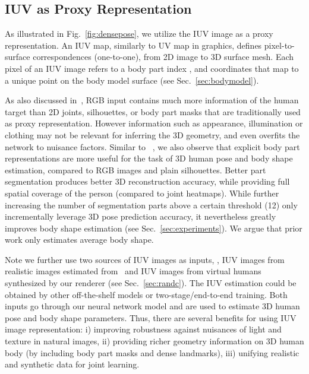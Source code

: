 \documentclass[10pt,twocolumn,letterpaper]{article}
\newcommand{\beforesubsection}{\vspace{0mm}}
\newcommand{\aftersubsection}{\vspace{0mm}}
\begin{document}
\beforesubsection
\subsection{IUV as Proxy Representation} \label{sec:IUVrep}
\aftersubsection

As illustrated in Fig.~\ref{fig:densepose}, we utilize the IUV image as a proxy representation. An IUV map, similarly to UV map in graphics, defines pixel-to-surface correspondences (one-to-one), from 2D image to 3D surface mesh. Each pixel of an IUV image refers to a body part index , and  coordinates that map to a unique point on the body model surface (see Sec.~\ref{sec:bodymodel}).

As also discussed in~\cite{NeuralBodyFit18}, RGB input contains much more information of the human target than 2D joints, silhouettes, or body part masks that are traditionally used as proxy representation. However information such as appearance, illumination or clothing may not be relevant for inferring the 3D geometry, and even overfits the network to nuisance factors. Similar to ~\cite{NeuralBodyFit18}, we also observe that explicit body part representations are more useful for the task of 3D human pose and body shape estimation, compared to RGB images and plain silhouettes. Better part segmentation produces better 3D reconstruction accuracy, while providing full spatial coverage of the person (compared to joint heatmaps).
While further increasing the number of segmentation parts above a certain threshold (12) only incrementally leverage 3D pose prediction accuracy, it nevertheless greatly improves body shape estimation (see Sec.~\ref{sec:experiments}).
We argue that prior work only estimates average body shape.

Note we further use two sources of IUV images as inputs, \ie, IUV images from realistic images estimated from~\cite{DensePose2018} and IUV images from virtual humans synthesized by our renderer (see Sec.~\ref{sec:randc}). The IUV estimation could be obtained by other off-the-shelf models or two-stage/end-to-end training.
Both inputs go through our neural network model and are used to estimate 3D human pose and body shape parameters.
Thus, there are several benefits for using IUV image representation: i) improving robustness against nuisances of light and texture in natural images, ii) providing richer geometry information on 3D human body (by including body part masks and dense landmarks), iii) unifying realistic and synthetic data for joint learning. 
\end{document}
